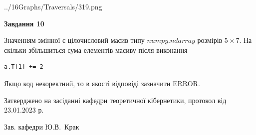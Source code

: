 \documentclass[12pt, ukrainian]{article}
\begin{document}
{\begin {large}
\begin{center}
	{../16Graphs/Traversals/319.png}
\end{center}\par
\newpage

{\begin {center}\textbf{Завдання 10}\end {center}}\par
Значенням змінної  є цілочисловий масив типу $numpy.ndarray$ розмірів $5{\times}7$. На скільки збільшиться сума елементів масиву  після виконання
\begin{verbatim}
a.T[1] += 2
\end{verbatim}


Якщо код некоректний, то в якості відповіді зазначити ERROR.\par
\newpage


\end {large}
}
{\smallskip \begin {small} Затверджено на засіданні кафедри теоретичної кібернетики, протокол  від   23.01.2023 р.\par\smallskip\smallskip
{\parbox {6.5 cm}{Зав. кафедри \dotfill Ю.В.~Крак}} \end{small}}
\end{document}
